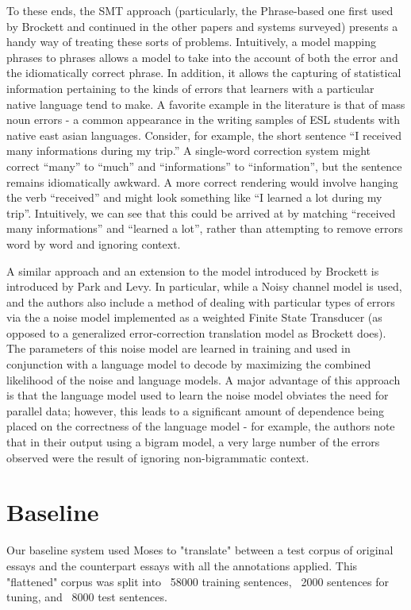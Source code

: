 \documentclass[11pt,letterpaper]{article}
\begin{document}
\indent To these ends, the SMT approach (particularly, the Phrase-based one first 
used by Brockett and continued in the other papers and systems surveyed) presents 
a handy way of treating these sorts of problems. Intuitively, a model mapping phrases to 
phrases allows a model to take into the account of both the error and the idiomatically correct 
phrase. In addition, it allows the capturing of statistical information pertaining to the kinds 
of errors that learners with a particular native language tend to make. A favorite example in the 
literature is that of mass noun errors - a common appearance in the writing samples of ESL students 
with native east asian languages. Consider, for example, the short sentence “I received many informations 
during my trip.”  A single-word correction system might correct “many” to “much” and “informations” to 
“information”, but the sentence remains idiomatically awkward. A more correct rendering would involve 
hanging the verb “received” and might look something like “I learned a lot during my trip”. Intuitively, 
we can see that this could be arrived at by matching “received many informations” and “learned a lot”, 
rather than attempting to remove errors word by word and ignoring context. \newline

\indent A similar approach and an extension to the model introduced by Brockett is introduced by Park and Levy. 
In particular, while a Noisy channel model is used, and the authors also include a method of dealing with particular 
types of errors via the a noise model implemented as a weighted Finite State Transducer (as opposed 
to a generalized error-correction translation model as Brockett does). The parameters of this noise model 
are learned in training and used in conjunction with a language model to decode by maximizing the combined 
likelihood of the noise and language models. A major advantage of this approach is that the language model 
used to learn the noise model obviates the need for parallel data; however, this leads to a significant 
amount of dependence being placed on the correctness of the language model - for example, the authors note 
that in their output using a bigram model, a very large number of the errors observed were the result of 
ignoring non-bigrammatic context. \newline

\section{Baseline}
Our baseline system used Moses to "translate" between a test corpus of original essays and the counterpart essays with all the annotations applied. This "flattened" corpus was split into ~58000 training sentences, ~2000 sentences for tuning, and ~8000 test sentences. 
\end{document}
